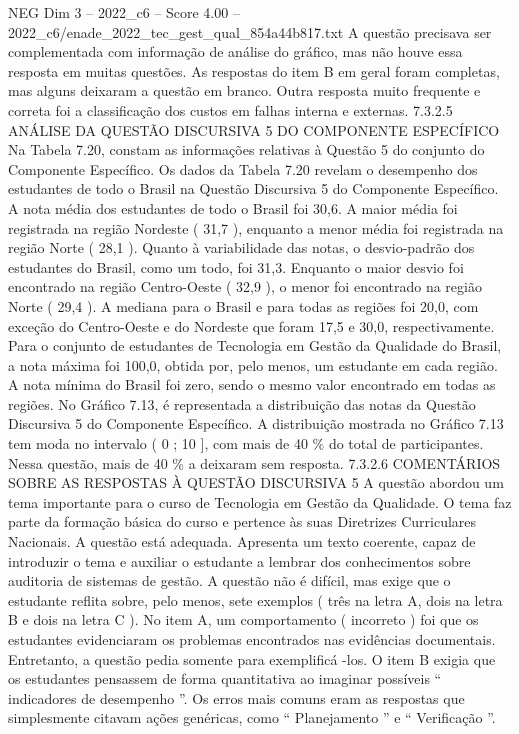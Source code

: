 \begin{textsample}{NEG Dim 3 – 2022\_c6 – Score 4.00 – 2022\_c6/enade\_2022\_tec\_gest\_qual\_854a44b817.txt}
A questão precisava ser complementada com informação de análise do gráfico, mas não houve essa resposta em muitas questões.
As respostas do item B em geral foram completas, mas alguns deixaram a questão em branco.
Outra resposta muito frequente e correta foi a classificação dos custos em falhas interna e externas. 7.3.2.5 ANÁLISE DA QUESTÃO DISCURSIVA 5 DO COMPONENTE ESPECÍFICO Na Tabela 7.20, constam as informações relativas à Questão 5 do conjunto do Componente Específico.
Os dados da Tabela 7.20 revelam o desempenho dos estudantes de todo o Brasil na Questão Discursiva 5 do Componente Específico.
A nota média dos estudantes de todo o Brasil foi 30,6.
A maior média foi registrada na região Nordeste ( 31,7 ), enquanto a menor média foi registrada na região Norte ( 28,1 ).
Quanto à variabilidade das notas, o desvio-padrão dos estudantes do Brasil, como um todo, foi 31,3.
Enquanto o maior desvio foi encontrado na região Centro-Oeste ( 32,9 ), o menor foi encontrado na região Norte ( 29,4 ).
A mediana para o Brasil e para todas as regiões foi 20,0, com exceção do Centro-Oeste e do Nordeste que foram 17,5 e 30,0, respectivamente.
Para o conjunto de estudantes de Tecnologia em Gestão da Qualidade do Brasil, a nota máxima foi 100,0, obtida por, pelo menos, um estudante em cada região.
A nota mínima do Brasil foi zero, sendo o mesmo valor encontrado em todas as regiões.
No Gráfico 7.13, é representada a distribuição das notas da Questão Discursiva 5 do Componente Específico.
A distribuição mostrada no Gráfico 7.13 tem moda no intervalo ( 0 ; 10 ], com mais de 40 \% do total de participantes.
Nessa questão, mais de 40 \% a deixaram sem resposta. 7.3.2.6 COMENTÁRIOS SOBRE AS RESPOSTAS À QUESTÃO DISCURSIVA 5 A questão abordou um tema importante para o curso de Tecnologia em Gestão da Qualidade.
O tema faz parte da formação básica do curso e pertence às suas Diretrizes Curriculares Nacionais.
A questão está adequada.
Apresenta um texto coerente, capaz de introduzir o tema e auxiliar o estudante a lembrar dos conhecimentos sobre auditoria de sistemas de gestão.
A questão não é difícil, mas exige que o estudante reflita sobre, pelo menos, sete exemplos ( três na letra A, dois na letra B e dois na letra C ).
No item A, um comportamento ( incorreto ) foi que os estudantes evidenciaram os problemas encontrados nas evidências documentais.
Entretanto, a questão pedia somente para exemplificá -los.
O item B exigia que os estudantes pensassem de forma quantitativa ao imaginar possíveis “ indicadores de desempenho ”.
Os erros mais comuns eram as respostas que simplesmente citavam ações genéricas, como “ Planejamento ” e “ Verificação ”.

\end{textsample}
